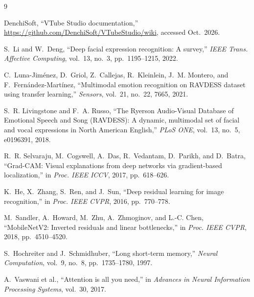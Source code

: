 \documentclass[10pt,a4paper,twocolumn]{article}
\begin{document}
{\small
\begin{thebibliography}{9}
\setlength{\itemsep}{0pt}

DenchiSoft, ``VTube Studio documentation,'' \url{https://github.com/DenchiSoft/VTubeStudio/wiki}, accessed Oct.~2026.

S.~Li and W.~Deng, ``Deep facial expression recognition: A survey,'' \emph{IEEE Trans. Affective Computing}, vol.~13, no.~3, pp.~1195--1215, 2022.

C.~Luna-Jim\'enez, D.~Griol, Z.~Callejas, R.~Kleinlein, J.~M. Montero, and F.~Fern\'andez-Mart\'inez, ``Multimodal emotion recognition on RAVDESS dataset using transfer learning,'' \emph{Sensors}, vol.~21, no.~22, 7665, 2021.

S.~R. Livingstone and F.~A. Russo, ``The Ryerson Audio-Visual Database of Emotional Speech and Song (RAVDESS): A dynamic, multimodal set of facial and vocal expressions in North American English,'' \emph{PLoS ONE}, vol.~13, no.~5, e0196391, 2018.

R.~R. Selvaraju, M.~Cogswell, A.~Das, R.~Vedantam, D.~Parikh, and D.~Batra, ``Grad-CAM: Visual explanations from deep networks via gradient-based localization,'' in \emph{Proc. IEEE ICCV}, 2017, pp.~618--626.

K.~He, X.~Zhang, S.~Ren, and J.~Sun, ``Deep residual learning for image recognition,'' in \emph{Proc. IEEE CVPR}, 2016, pp.~770--778.

M.~Sandler, A.~Howard, M.~Zhu, A.~Zhmoginov, and L.-C. Chen, ``MobileNetV2: Inverted residuals and linear bottlenecks,'' in \emph{Proc. IEEE CVPR}, 2018, pp.~4510--4520.

S.~Hochreiter and J.~Schmidhuber, ``Long short-term memory,'' \emph{Neural Computation}, vol.~9, no.~8, pp.~1735--1780, 1997.

A.~Vaswani et al., ``Attention is all you need,'' in \emph{Advances in Neural Information Processing Systems}, vol.~30, 2017.

\end{thebibliography}
}
\end{document}
